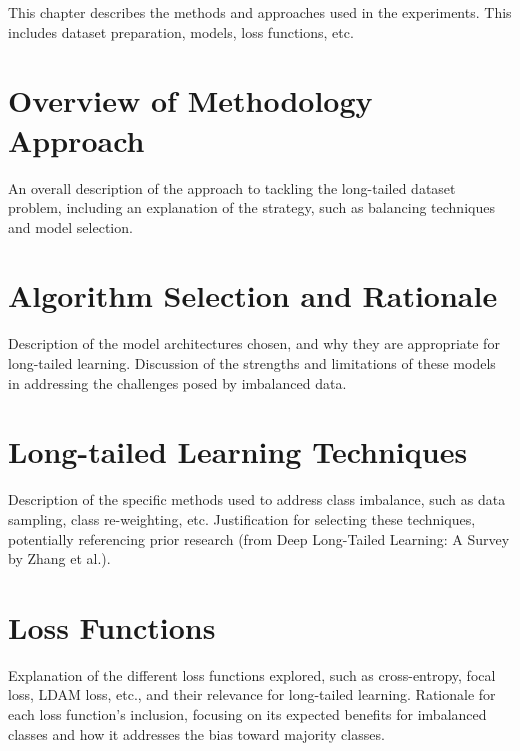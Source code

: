 
This chapter describes the methods and approaches used in the experiments. This includes dataset preparation, models, loss functions, etc.

\section{Overview of Methodology Approach}
An overall description of the approach to tackling the long-tailed dataset problem, including an explanation of the strategy, 
such as balancing techniques and model selection.

\section{Algorithm Selection and Rationale}
Description of the model architectures chosen, and why they are appropriate for long-tailed learning.
Discussion of the strengths and limitations of these models in addressing the challenges posed by imbalanced data.

\section{Long-tailed Learning Techniques}
Description of the specific methods used to address class imbalance, such as data sampling, class re-weighting, etc. 
Justification for selecting these techniques, potentially referencing prior research (from Deep Long-Tailed Learning: A Survey by Zhang et al.).


\section{Loss Functions}
Explanation of the different loss functions explored, such as cross-entropy, focal loss, LDAM loss, etc., and their relevance for long-tailed learning.
Rationale for each loss function's inclusion, focusing on its expected benefits for imbalanced classes and how it addresses the bias toward majority classes.


